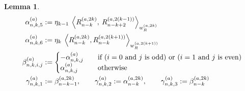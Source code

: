 \documentclass[11pt, oneside]{article}   	%
\newcommand{\genjac}{R}
\newcommand{\genjacnmk}{\genjac_{n-k}}
\newcommand{\genjacw}{w_\genjac}
\newcommand{\alphaa}{\alpha^{(a)}}
\newcommand{\betaa}{\beta^{(a)}}
\newcommand{\gammaa}{\gamma^{(a)}}
\newtheorem{lemma}{Lemma}
\begin{document}
\begin{lemma}
\begin{align*}
	\alphaa_{n,k,5} &:= \eta_{k-1} \: \ip<\genjacnmk^{(a, 2k)}, \: \genjac_{n-k+2}^{(a, 2(k-1))}>_{\genjacw^{(a, 2k)}} \\
	\alphaa_{n,k,6} &:=\eta_{k} \: \ip<\genjacnmk^{(a, 2k)}, \genjacnmk^{(a, 2(k+1))}>_{\genjacw^{(a, 2(k+1))}} \\
	\betaa_{n,k,i,j} &:= 
		\begin{cases}
			- \alphaa_{n,k,j} \quad &\text{if }(i = 0 \text{ and } j \text{ is odd}) \text{ or }(i = 1 \text{ and } j \text{ is even}) \\
			\alphaa_{n,k,j} \quad &\text{otherwise}
		\end{cases} \\	
	\gammaa_{n,k,1} &:= \beta_{n-k-1}^{(a, 2k)}, \qquad \gammaa_{n,k,2} := \alpha_{n-k}^{(a, 2k)}, \qquad \gammaa_{n,k,3} := \beta_{n-k}^{(a, 2k)}
\end{align*}
\end{lemma}
\end{document}
